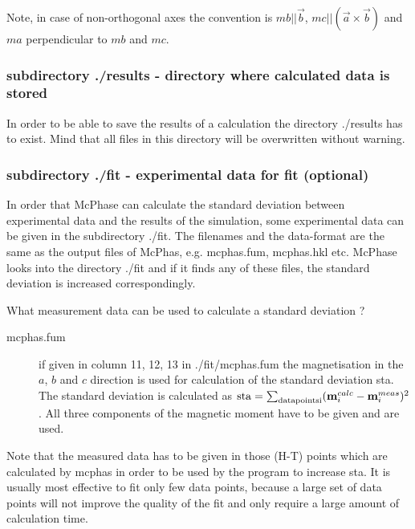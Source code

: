 
Note, in case of non-orthogonal axes the convention 
is $mb||\vec b$, $mc||(\vec a \times \vec b)$ and $ma$ perpendicular to $mb$ and $mc$.

\subsubsection{subdirectory {\prg ./results} - directory where calculated data is stored}

In order to be able to save the results of a calculation the directory {\prg ./results} has to
exist. Mind that all files in this directory will be overwritten without warning. 

\subsubsection{subdirectory {\prg ./fit} - experimental data for fit (optional) } 

In order that {\prg McPhase} can calculate the standard deviation between
 experimental data and the results of the simulation, some experimental data
 can be given in the subdirectory {\prg ./fit}. The filenames and the data-format
 are the same as the output files of {\prg McPhas}, e.g. {\prg mcphas.fum}, {\prg mcphas.hkl}
 etc. {\prg McPhase} looks into the directory {\prg ./fit} and if it finds any
 of these files, the standard deviation is increased correspondingly. 

What measurement data can be used to calculate a standard deviation ?

\begin{description}
\item[{\prg mcphas.fum}] if given in column 11, 12, 13 in {\prg ./fit/mcphas.fum} the
            magnetisation in the $a$, $b$ and $c$ direction is used for calculation
	    of the standard deviation sta. The standard deviation is calculated
	    as ${\rm sta}=\sum_{\rm data points i} ({\mathbf m}_i^{calc}-{\mathbf m}_i^{meas})^2$.
	    All three components of the magnetic moment have to be given and are used.

\end{description}

Note that the measured data has to be given in those (H-T) points which are 
calculated by mcphas in order to be used by the program to increase {\prg sta}.
It is usually most effective to fit only few data points, because a large set
of data points will not improve the quality of the fit and only require a large
amount of calculation time.



